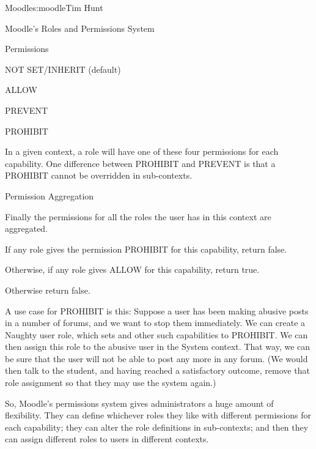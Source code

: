 \begin{aosachapter}{Moodle}{s:moodle}{Tim Hunt}
\begin{aosasect1}{Moodle's Roles and Permissions System}
\begin{aosasect2}{Permissions}
\begin{aosaitemize}
\item NOT SET/INHERIT (default)

\item ALLOW

\item PREVENT

\item PROHIBIT 

\end{aosaitemize}

In a given context, a role will have one of these four permissions for
each capability. One difference between PROHIBIT and PREVENT is that a
PROHIBIT cannot be overridden in sub-contexts.

\end{aosasect2}

\begin{aosasect2}{Permission Aggregation}

Finally the permissions for all the roles the user has in
this context are aggregated.

\begin{aosaitemize}

\item If any role gives the permission PROHIBIT for this capability,
  return false.

\item Otherwise, if any role gives ALLOW for this capability, return
  true.

\item Otherwise return false.

\end{aosaitemize}

A use case for PROHIBIT is this: Suppose a user has been making
abusive posts in a number of forums, and we want to stop them
immediately. We can create a Naughty user role, which sets
 and other such capabilities to PROHIBIT. We can
then assign this role to the abusive user in the System context. That
way, we can be sure that the user will not be able to post any more in
any forum. (We would then talk to the student, and having reached a
satisfactory outcome, remove that role assignment so that they may
use the system again.)

So, Moodle's permissions system gives administrators a huge amount of
flexibility. They can define whichever roles they like with different
permissions for each capability; they can alter the role definitions
in sub-contexts; and then they can assign different roles to users in
different contexts.


\end{aosasect2}
\end{aosasect1}
\end{aosachapter}
